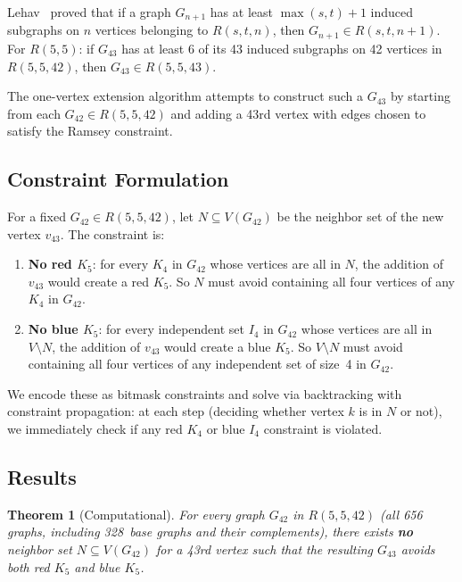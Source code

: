 \documentclass[11pt,a4paper]{article}
\newtheorem{theorem}{Theorem}
\theoremstyle{definition}
\theoremstyle{remark}
\newcommand{\Rset}[3]{R(#1,#2,#3)}
\begin{document}
Lehav~\cite{Lehav2024} proved that if a graph $G_{n+1}$
has at least $\max(s,t) + 1$ induced subgraphs on $n$ vertices
belonging to $\Rset{s}{t}{n}$, then $G_{n+1} \in \Rset{s}{t}{n+1}$.
For $R(5,5)$: if $G_{43}$ has at least 6 of its 43 induced
subgraphs on 42 vertices in $\Rset{5}{5}{42}$, then
$G_{43} \in \Rset{5}{5}{43}$.

The one-vertex extension algorithm attempts to construct
such a $G_{43}$ by starting from each $G_{42} \in \Rset{5}{5}{42}$
and adding a 43rd vertex with edges chosen to satisfy
the Ramsey constraint.

\subsection{Constraint Formulation}

For a fixed $G_{42} \in \Rset{5}{5}{42}$, let $N \subseteq V(G_{42})$
be the neighbor set of the new vertex $v_{43}$.
The constraint is:
\begin{enumerate}
  \item \textbf{No red $K_5$}: for every $K_4$ in $G_{42}$
    whose vertices are all in $N$, the addition of $v_{43}$
    would create a red $K_5$. So $N$ must avoid containing
    all four vertices of any $K_4$ in $G_{42}$.
  \item \textbf{No blue $K_5$}: for every independent set $I_4$
    in $G_{42}$ whose vertices are all in $V \setminus N$,
    the addition of $v_{43}$ would create a blue $K_5$.
    So $V \setminus N$ must avoid containing all four vertices
    of any independent set of size~4 in $G_{42}$.
\end{enumerate}

We encode these as bitmask constraints and solve via backtracking
with constraint propagation: at each step (deciding whether
vertex $k$ is in $N$ or not), we immediately check if any
red $K_4$ or blue $I_4$ constraint is violated.

\subsection{Results}

\begin{theorem}[Computational]
\label{thm:lehav}
For every graph $G_{42}$ in $\Rset{5}{5}{42}$ (all 656 graphs,
including 328~base graphs and their complements), there exists
\textbf{no} neighbor set $N \subseteq V(G_{42})$ for a 43rd vertex
such that the resulting $G_{43}$ avoids both red $K_5$ and blue $K_5$.
\end{theorem}
\end{document}
